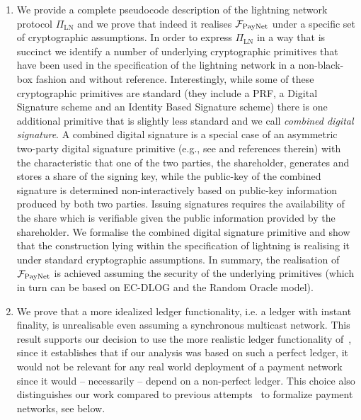 \begin{enumerate}
\item We provide a complete pseudocode description of the lightning network
protocol $\Pi_{\mathrm{LN}}$ and we prove that indeed it realises $\mathcal{F}_{\mathrm{PayNet}}{}$
under a specific set of cryptographic assumptions. In order to express
$\Pi_{\mathrm{LN}}$ in a way that is succinct we identify a number of underlying
cryptographic primitives that have been used in the specification of the
lightning network in a non-black-box fashion and without reference.
Interestingly, while some of these cryptographic primitives are standard (they
include a PRF, a Digital Signature scheme and an Identity Based Signature
scheme) there is one additional primitive that is slightly less standard and we
call {\em combined digital signature}. A combined digital signature is a special
case of an asymmetric two-party digital signature primitive (e.g., see
\cite{DBLP:conf/ndss/NicolosiKDM03} and references therein) with the
characteristic that one of the two parties, the shareholder, generates and
stores a share of the signing key, while the public-key of the combined
signature is determined non-interactively based on public-key information
produced by both two parties. Issuing signatures requires the availability of
the share which is verifiable given the public information provided by the
shareholder. We formalise the combined digital signature primitive and show that
the construction lying within the specification of lightning is realising it
under standard cryptographic assumptions. In summary, the realisation of
$\mathcal{F}_{\mathrm{PayNet}}{}$ is achieved assuming the security of the underlying primitives
(which in turn can be based on EC-DLOG and the Random Oracle model).

\item We prove that a more idealized  ledger functionality, i.e. a
ledger with instant finality, is unrealisable even assuming a synchronous
multicast network. This result supports our decision to use the more realistic
ledger functionality of~\cite{BMTZ17}, since it establishes that if our analysis
was based on such a perfect ledger, it would not be relevant 
for any real world deployment of a payment network since it would
 -- necessarily -- depend on a non-perfect ledger. This choice also distinguishes our work compared to previous attempts~\cite{DBLP:conf/ccs/DziembowskiFH18,Malavolta:2017:CPP:3133956.3134096,sprites,perun}
 to formalize payment networks, see below.
\end{enumerate}


